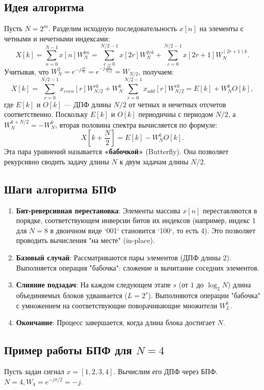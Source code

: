 \documentclass[12pt,a4paper]{article}
\theoremstyle{definition}
\begin{document}
\subsection{Идея алгоритма}
Пусть $N = 2^m$. Разделим исходную последовательность $x[n]$ на элементы с четными и нечетными индексами:
$$ X[k] = \sum_{n=0}^{N-1} x[n] W_N^{kn} = \sum_{r=0}^{N/2-1} x[2r] W_N^{2rk} + \sum_{r=0}^{N/2-1} x[2r+1] W_N^{(2r+1)k}. $$
Учитывая, что $W_N^{2} = e^{-j \frac{4\pi}{N}} = e^{-j \frac{2\pi}{N/2}} = W_{N/2}$, получаем:
$$ X[k] = \sum_{r=0}^{N/2-1} x_{even}[r] W_{N/2}^{rk} + W_N^k \sum_{r=0}^{N/2-1} x_{odd}[r] W_{N/2}^{rk} = E[k] + W_N^k O[k], $$
где $E[k]$ и $O[k]$ — ДПФ длины $N/2$ от четных и нечетных отсчетов соответственно.
Поскольку $E[k]$ и $O[k]$ периодичны с периодом $N/2$, а $W_N^{k+N/2} = -W_N^k$, вторая половина спектра вычисляется по формуле:
$$ X\left[k + \frac{N}{2}\right] = E[k] - W_N^k O[k]. $$
Эта пара уравнений называется \textbf{«бабочкой»} (Butterfly). Она позволяет рекурсивно сводить задачу длины $N$ к двум задачам длины $N/2$.

\subsection{Шаги алгоритма БПФ}
\begin{enumerate}
    \item \textbf{Бит-реверсивная перестановка}: Элементы массива $x[n]$ переставляются в порядке, соответствующем инверсии битов их индексов (например, индекс 1 для $N=8$ в двоичном виде `001` становится `100`, то есть 4). Это позволяет проводить вычисления "на месте" (in-place).
    \item \textbf{Базовый случай}: Рассматриваются пары элементов (ДПФ длины 2). Выполняется операция "бабочка": сложение и вычитание соседних элементов.
    \item \textbf{Слияние подзадач}: На каждом следующем этапе $s$ (от $1$ до $\log_2 N$) длина объединяемых блоков удваивается ($L = 2^s$). Выполняются операции "бабочка" с умножением на соответствующие поворачивающие множители $W_L^k$.
    \item \textbf{Окончание}: Процесс завершается, когда длина блока достигает $N$.
\end{enumerate}

\subsection{Пример работы БПФ для $N=4$}
Пусть задан сигнал $x = [1, 2, 3, 4]$. Вычислим его ДПФ через БПФ. $N=4, W_4 = e^{-j\pi/2} = -j$.
\end{document}
